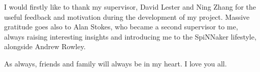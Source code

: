 I would firstly like to thank my supervisor, David Lester and Ning Zhang for the useful feedback and motivation during the development of my project. Massive gratitude goes also to Alan Stokes, who became a second supervisor to me, always raising interesting insights and introducing me to the SpiNNaker lifestyle, alongside Andrew Rowley.

As always, friends and family will always be in my heart. I love you all.